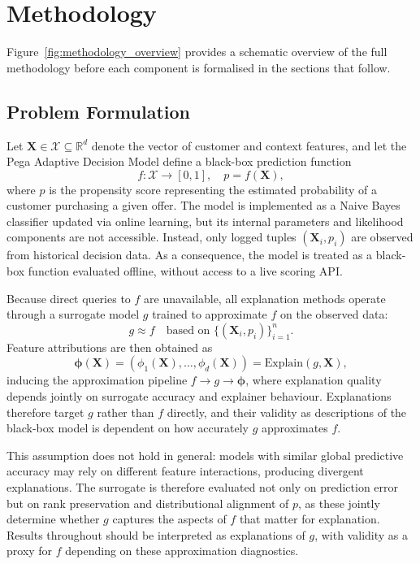 \documentclass[oneside]{memoir} %
\begin{document}
\chapter{Methodology} \label{Methodology}

Figure~\ref{fig:methodology_overview} provides a schematic overview of the full methodology before each component is formalised in the sections that follow.

\section{Problem Formulation} \label{sec:formulation}

Let $\mathbf{X} \in \mathcal{X} \subseteq \mathbb{R}^d$ denote the vector of customer and context features, and let the Pega Adaptive Decision Model define a black-box prediction function
\[
f: \mathcal{X} \rightarrow [0,1], \quad p = f(\mathbf{X}),
\]
where $p$ is the propensity score representing the estimated probability of a customer purchasing a given offer. The model is implemented as a Naive Bayes classifier updated via online learning, but its internal parameters and likelihood components are not accessible. Instead, only logged tuples $(\mathbf{X}_i, p_i)$ are observed from historical decision data. As a consequence, the model is treated as a black-box function evaluated offline, without access to a live scoring API.

Because direct queries to $f$ are unavailable, all explanation methods operate through a surrogate model $g$ trained to approximate $f$ on the observed data:
\[
g \approx f \quad \text{based on } \{(\mathbf{X}_i, p_i)\}_{i=1}^n.
\]
Feature attributions are then obtained as
\[
\boldsymbol{\phi}(\mathbf{X}) = (\phi_1(\mathbf{X}), \ldots, \phi_d(\mathbf{X})) =
\text{Explain}(g, \mathbf{X}),
\]
inducing the approximation pipeline $f \rightarrow g \rightarrow \boldsymbol{\phi}$, where explanation quality depends jointly on surrogate accuracy and explainer behaviour. Explanations therefore target $g$ rather than $f$ directly, and their validity as descriptions of the black-box model is dependent on how accurately $g$ approximates $f$.

This assumption does not hold in general: models with similar global predictive accuracy may rely on different feature interactions, producing divergent explanations. The surrogate is therefore evaluated not only on prediction error but on rank preservation and distributional alignment of $p$, as these jointly determine whether $g$ captures the aspects of $f$ that matter for explanation. Results throughout should be interpreted as explanations of $g$, with validity as a proxy for $f$ depending on these approximation diagnostics.
\end{document}
